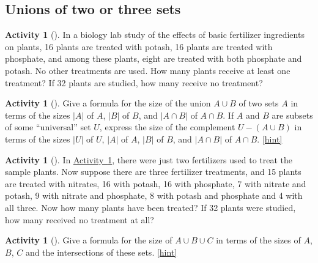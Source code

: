 \documentclass[10pt,]{book}
\theoremstyle{plain}
\theoremstyle{definition}
\theoremstyle{definition}
\theoremstyle{definition}
\newtheorem{activity}[project]{Activity}
\numberwithin{equation}{chapter}
\begin{document}
\subsection[{Unions of two or three sets}]{Unions of two or three sets}\label{subsection-26}
\begin{activity}[]\label{fertilizer2}
\hypertarget{p-1166}{}%
In a biology lab study of the effects of basic fertilizer ingredients on plants, 16 plants are treated with potash, 16 plants are treated with phosphate, and among these plants, eight are treated with both phosphate and potash. No other treatments are used. How many plants receive at least one treatment? If 32 plants are studied, how many receive no treatment?%
\end{activity}
\begin{activity}[]\label{twosetintersection}
\hypertarget{p-1168}{}%
Give a formula for the size of the union \(A\cup B\) of two sets \(A\) in terms of the sizes \(|A|\) of \(A\), \(|B|\) of \(B\), and \(|A\cap B|\) of \(A\cap B\). If \(A\) and \(B\) are subsets of some ``universal'' set \(U\), express the size of the complement \(U-(A\cup B)\) in terms of the sizes \(|U|\) of \(U\), \(|A|\) of \(A\), \(|B|\) of \(B\), and \(|A\cap B|\) of \(A\cap B\).%
\hfill{\tiny\hyperlink{a-217}{[hint]}\hypertarget{q-217}{}}\end{activity}
\begin{activity}[]\label{activity-211}
\hypertarget{p-1172}{}%
In \hyperref[fertilizer2]{Activity~\ref{fertilizer2}}, there were just two fertilizers used to treat the sample plants. Now suppose there are three fertilizer treatments, and 15 plants are treated with nitrates, 16 with potash, 16 with phosphate, 7 with nitrate and potash, 9 with nitrate and phosphate, 8 with potash and phosphate and 4 with all three. Now how many plants have been treated? If 32 plants were studied, how many received no treatment at all?%
\end{activity}
\begin{activity}[]\label{threesetintersection}
\hypertarget{p-1174}{}%
Give a formula for the size of \(A\cup B\cup C\) in terms of the sizes of \(A\), \(B\), \(C\) and the intersections of these sets.%
\hfill{\tiny\hyperlink{a-219}{[hint]}\hypertarget{q-219}{}}\end{activity}
\typeout{************************************************}
\typeout{************************************************}
\end{document}
